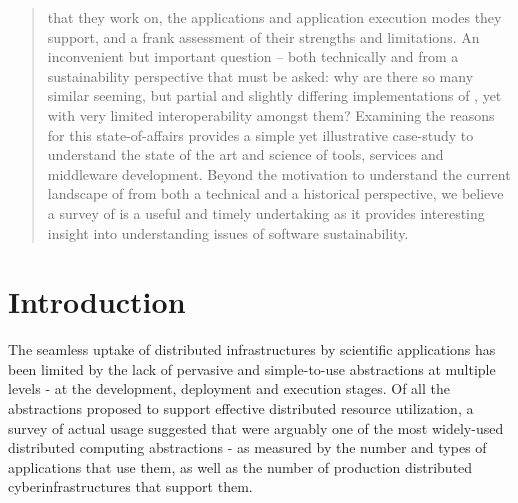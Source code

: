 \documentclass{sig-alternate}
\begin{document}
\begin{abstract}
  that they work on, the applications and application execution modes
  they support, and a frank assessment of their strengths and
  limitations.  An inconvenient but important question -- both
  technically and from a sustainability perspective that must be
  asked: why are there so many similar seeming, but partial and
  slightly differing implementations of \pilotjobs, yet with very
  limited interoperability amongst them?  Examining the reasons for
  this state-of-affairs provides a simple yet illustrative case-study
  to understand the state of the art and science of tools, services
  and middleware development.  Beyond the motivation to understand the
  current landscape of \pilotjobs from both a technical and a
  historical perspective, we believe a survey of \pilotjobs is a
  useful and timely undertaking as it provides interesting insight
  into understanding issues of software sustainability.
\end{abstract}

\section{Introduction}\label{sec:intro}



The seamless uptake of distributed infrastructures by scientific
applications has been limited by the lack of pervasive and
simple-to-use abstractions at multiple levels - at the development,
deployment and execution stages. Of all the abstractions proposed to
support effective distributed resource utilization, a survey of actual
usage suggested that \pilotjobs were arguably one of the most
widely-used distributed computing abstractions - as measured by the
number and types of applications that use them, as well as the number
of production distributed cyberinfrastructures that support them.
\end{document}
